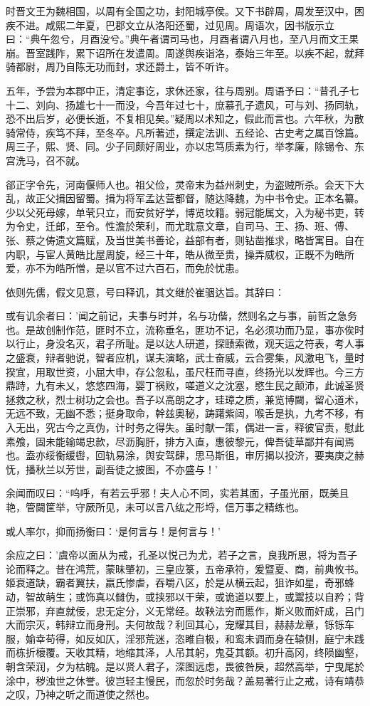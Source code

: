 \documentclass[12pt,UTF8]{ctexbook}
\begin{document}
时晋文王为魏相国，以周有全国之功，封阳城亭侯。又下书辟周，周发至汉中，困疾不进。咸熙二年夏，巴郡文立从洛阳还蜀，过见周。周语次，因书版示立曰：“典午忽兮，月酉没兮。”典午者谓司马也，月酉者谓八月也，至八月而文王果崩。晋室践阼，累下诏所在发遣周。周遂舆疾诣洛，泰始三年至。以疾不起，就拜骑都尉，周乃自陈无功而封，求还爵土，皆不听许。

五年，予尝为本郡中正，清定事讫，求休还家，往与周别。周语予曰：“昔孔子七十二、刘向、扬雄七十一而没，今吾年过七十，庶慕孔子遗风，可与刘、扬同轨，恐不出后岁，必便长逝，不复相见矣。”疑周以术知之，假此而言也。六年秋，为散骑常侍，疾笃不拜，至冬卒。凡所著述，撰定法训、五经论、古史考之属百馀篇。周三子，熙、贤、同。少子同颇好周业，亦以忠笃质素为行，举孝廉，除锡令、东宫洗马，召不就。

郤正字令先，河南偃师人也。祖父俭，灵帝末为益州刺史，为盗贼所杀。会天下大乱，故正父揖因留蜀。揖为将军孟达营都督，随达降魏，为中书令史。正本名纂。少以父死母嫁，单茕只立，而安贫好学，博览坟籍。弱冠能属文，入为秘书吏，转为令史，迁郎，至令。性澹於荣利，而尤耽意文章，自司马、王、扬、班、傅、张、蔡之俦遗文篇赋，及当世美书善论，益部有者，则钻凿推求，略皆寓目。自在内职，与宦人黄皓比屋周旋，经三十年，皓从微至贵，操弄威权，正既不为皓所爱，亦不为皓所憎，是以官不过六百石，而免於忧患。

依则先儒，假文见意，号曰释讥，其文继於崔骃达旨。其辞曰：

或有讥余者曰：'闻之前记，夫事与时并，名与功偕，然则名之与事，前哲之急务也。是故创制作范，匪时不立，流称垂名，匪功不记，名必须功而乃显，事亦俟时以行止，身没名灭，君子所耻。是以达人研道，探赜索微，观天运之符表，考人事之盛衰，辩者驰说，智者应机，谋夫演略，武士奋威，云合雾集，风激电飞，量时揆宜，用取世资，小屈大申，存公忽私，虽尺枉而寻直，终扬光以发辉也。今三方鼎跱，九有未乂，悠悠四海，婴丁祸败，嗟道义之沈塞，愍生民之颠沛，此诚圣贤拯救之秋，烈士树功之会也。吾子以高朗之才，珪璋之质，兼览博闚，留心道术，无远不致，无幽不悉；挺身取命，幹兹奥秘，踌躇紫闼，喉舌是执，九考不移，有入无出，究古今之真伪，计时务之得失。虽时献一策，偶进一言，释彼官责，慰此素飧，固未能输竭忠款，尽沥胸肝，排方入直，惠彼黎元，俾吾徒草鄙并有闻焉也。盍亦绥衡缓辔，回轨易涂，舆安驾肆，思马斯徂，审厉揭以投济，要夷庚之赫怃，播秋兰以芳世，副吾徒之披图，不亦盛与！’

余闻而叹曰：“呜呼，有若云乎邪！夫人心不同，实若其面，子虽光丽，既美且艳，管闚筐举，守厥所见，未可以言八纮之形埒，信万事之精练也。

或人率尔，抑而扬衡曰：‘是何言与！是何言与！’

余应之曰：'虞帝以面从为戒，孔圣以悦己为尤，若子之言，良我所思，将为吾子论而释之。昔在鸿荒，蒙昧肇初，三皇应箓，五帝承符，爰暨夏、商，前典攸书。姬衰道缺，霸者翼扶，嬴氏惨虐，吞嚼八区，於是从横云起，狙诈如星，奇邪蜂动，智故萌生；或饰真以雠伪，或挟邪以干荣，或诡道以要上，或鬻技以自矜；背正崇邪，弃直就佞，忠无定分，义无常经。故鞅法穷而慝作，斯义败而奸成，吕门大而宗灭，韩辩立而身刑。夫何故哉？利回其心，宠耀其目，赫赫龙章，铄铄车服，媮幸苟得，如反如仄，淫邪荒迷，恣睢自极，和鸾未调而身在辕侧，庭宁未践而栋折榱覆。天收其精，地缩其泽，人吊其躬，鬼芟其额。初升高冈，终陨幽壑，朝含荣润，夕为枯魄。是以贤人君子，深图远虑，畏彼咎戾，超然高举，宁曳尾於涂中，秽浊世之休誉。彼岂轻主慢民，而忽於时务哉？盖易著行止之戒，诗有靖恭之叹，乃神之听之而道使之然也。
\end{document}
